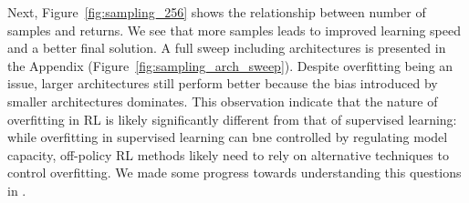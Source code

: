 Next, Figure~\ref{fig:sampling_256} shows the relationship between number of samples and returns. We see that more samples leads to improved learning speed and a better final solution. A full sweep including architectures is presented in the Appendix (Figure~\ref{fig:sampling_arch_sweep}). Despite overfitting being an issue, larger architectures still perform better because the bias introduced by smaller architectures dominates. This observation indicate that the nature of overfitting in RL is likely significantly different from that of supervised learning: while overfitting in supervised learning can bne controlled by regulating model capacity, off-policy RL methods likely need to rely on alternative techniques to control overfitting. We made some progress towards understanding this questions in \citet{li2022effective}.   

